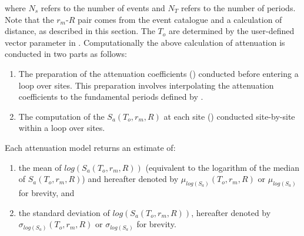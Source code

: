 where $N_s$ refers to the number of events and $N_T$ refers to the
number of periods. Note that the $r_m$-$R$ pair comes from the event
catalogue and a calculation of distance, as described in this
section. The $T_o$ are determined by the user-defined vector
parameter  in .
Computationally the above calculation of attenuation is conducted in
two parts as follows:
\begin{enumerate}
\item The preparation of the attenuation coefficients
() conducted before entering a loop over
sites. This preparation involves interpolating the attenuation
coefficients to the fundamental periods defined by
. \item The computation of the $S_a(T_o,r_m,R)$
at each site () conducted site-by-site
within a loop over sites.
\end{enumerate}


Each attenuation model returns an estimate of:
\begin{enumerate}
\item the mean of $log(S_a(T_o,r_m,R))$ (equivalent to the
logarithm of the median of $S_a(T_o,r_m,R)$) and hereafter denoted
by $\mu_{log(S_a)}(T_o,r_m,R)$ or $\mu_{log(S_a)}$ for brevity, and
\item the standard deviation of $log(S_a(T_o,r_m,R))$, hereafter
denoted by \newline $\sigma_{log(S_a)}(T_o,r_m,R)$ or
$\sigma_{log(S_a)}$ for brevity.
\end{enumerate}


